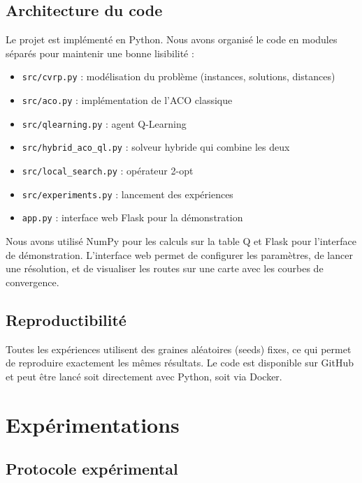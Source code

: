\documentclass[12pt, a4paper]{article}
\begin{document}
\subsection{Architecture du code}

Le projet est implémenté en Python. Nous avons organisé le code en modules séparés pour maintenir une bonne lisibilité :

\begin{itemize}
    \item \texttt{src/cvrp.py} : modélisation du problème (instances, solutions, distances)
    \item \texttt{src/aco.py} : implémentation de l'ACO classique
    \item \texttt{src/qlearning.py} : agent Q-Learning
    \item \texttt{src/hybrid\_aco\_ql.py} : solveur hybride qui combine les deux
    \item \texttt{src/local\_search.py} : opérateur 2-opt
    \item \texttt{src/experiments.py} : lancement des expériences
    \item \texttt{app.py} : interface web Flask pour la démonstration
\end{itemize}

Nous avons utilisé NumPy pour les calculs sur la table Q et Flask pour l'interface de démonstration. L'interface web permet de configurer les paramètres, de lancer une résolution, et de visualiser les routes sur une carte avec les courbes de convergence.

\subsection{Reproductibilité}

Toutes les expériences utilisent des graines aléatoires (seeds) fixes, ce qui permet de reproduire exactement les mêmes résultats. Le code est disponible sur GitHub et peut être lancé soit directement avec Python, soit via Docker.

\section{Expérimentations}

\subsection{Protocole expérimental}
\end{document}
